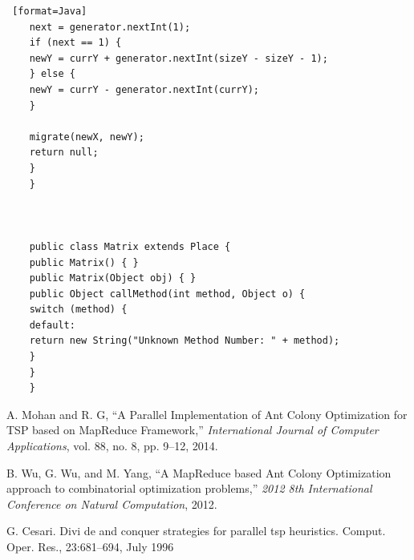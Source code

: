 \documentclass[11pt, letterpaper]{article}
\begin{document}
\begin{lstlisting} [format=Java]
	next = generator.nextInt(1);
	if (next == 1) {
	newY = currY + generator.nextInt(sizeY - sizeY - 1);
	} else {
	newY = currY - generator.nextInt(currY);
	}
	
	migrate(newX, newY);
	return null;
	}
	}

	
	
	public class Matrix extends Place {
	public Matrix() { }
	public Matrix(Object obj) { }
	public Object callMethod(int method, Object o) {
	switch (method) {
	default:
	return new String("Unknown Method Number: " + method);
	}
	}
	}
	\end{lstlisting}
	
	\begin{thebibliography}{9}
		
		A. Mohan and R. G, “A Parallel Implementation of Ant Colony Optimization for TSP based on MapReduce Framework,” \textit{International Journal of Computer Applications}, vol. 88, no. 8, pp. 9–12, 2014.
		
		B. Wu, G. Wu, and M. Yang, “A MapReduce based Ant Colony Optimization approach to combinatorial optimization problems,” \textit{2012 8th International Conference on Natural Computation}, 2012.
		
		G. Cesari. Divi de and conquer strategies for parallel tsp heuristics.
		Comput. Oper. Res., 23:681–694, July 1996
		
	\end{thebibliography}
	
\end{document}
